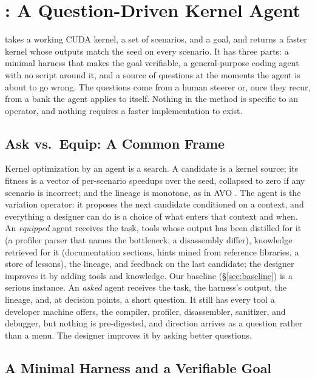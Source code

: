 \section{\sys: A Question-Driven Kernel Agent}
\label{sec:workflow}

\sys takes a working CUDA kernel, a set of scenarios, and a goal, and returns a faster kernel whose
outputs match the seed on every scenario. It has three parts: a minimal harness that makes the goal
verifiable, a general-purpose coding agent with no script around it, and a source of questions at the
moments the agent is about to go wrong. The questions come from a human steerer or, once they recur,
from a bank the agent applies to itself. Nothing in the method is specific to an operator, and
nothing requires a faster implementation to exist.

\subsection{Ask vs.\ Equip: A Common Frame}
\label{sec:ask-vs-equip}
\label{sec:frame}

Kernel optimization by an agent is a search. A candidate is a kernel source; its fitness is a vector
of per-scenario speedups over the seed, collapsed to zero if any scenario is incorrect; and the
lineage is monotone, as in AVO \cite{chen2026avo}. The agent is the variation operator: it proposes
the next candidate conditioned on a context, and everything a designer can do is a choice of what
enters that context and when. An \emph{equipped} agent receives the task, tools whose output has
been distilled for it (a profiler parser that names the bottleneck, a disassembly differ), knowledge
retrieved for it (documentation sections, hints mined from reference libraries, a store of lessons),
the lineage, and feedback on the last candidate; the designer improves it by adding tools and
knowledge. Our baseline (\S\ref{sec:baseline}) is a serious instance. An \emph{asked} agent receives
the task, the harness's output, the lineage, and, at decision points, a short question. It still has
every tool a developer machine offers, the compiler, profiler, disassembler, sanitizer, and
debugger, but nothing is pre-digested, and direction arrives as a question rather than a menu. The
designer improves it by asking better questions.

\subsection{A Minimal Harness and a Verifiable Goal}
\label{sec:workflow-harness}

